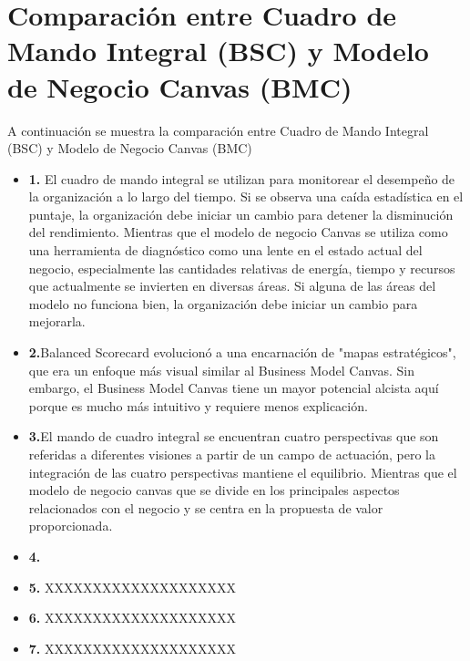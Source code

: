 \documentclass[preprint,12pt]{elsarticle}
\begin{document}



\section{Comparación entre Cuadro de Mando Integral (BSC) y Modelo de Negocio Canvas (BMC)}
A continuación se muestra la comparación entre Cuadro de Mando Integral (BSC) y Modelo de Negocio Canvas (BMC)
	
	\begin{itemize}

	\item{\textbf{1.}} El cuadro de mando integral se utilizan para monitorear el desempeño de la organización a lo largo del tiempo. Si se observa una caída estadística en el puntaje,
	 la organización debe iniciar un cambio para detener la disminución del rendimiento. Mientras que el  modelo de negocio Canvas se utiliza como una herramienta de diagnóstico como
 una lente en el estado actual del negocio, especialmente las cantidades relativas de energía, tiempo y recursos que actualmente se invierten en diversas áreas. Si alguna de las áreas del modelo no funciona bien, la organización debe iniciar un cambio para mejorarla.
	\item{\textbf{2.}}Balanced Scorecard evolucionó a una encarnación de "mapas estratégicos", que era un enfoque más visual similar al Business Model Canvas. Sin embargo, el Business Model Canvas tiene un mayor potencial alcista aquí porque es mucho más intuitivo y requiere menos explicación.
	\item{\textbf{3.}}El mando de cuadro integral se encuentran cuatro perspectivas que son referidas a diferentes visiones a partir de un campo de actuación, pero la integración de las cuatro perspectivas mantiene el equilibrio. Mientras que el modelo de negocio canvas que se divide en los principales aspectos relacionados con el negocio y se centra en la propuesta de valor proporcionada.
	\item{\textbf{4.}} 
	\item{\textbf{5.}} XXXXXXXXXXXXXXXXXXXX
	\item{\textbf{6.}} XXXXXXXXXXXXXXXXXXXX
	\item{\textbf{7.}} XXXXXXXXXXXXXXXXXXXX
	\end{itemize}
\end{document}
